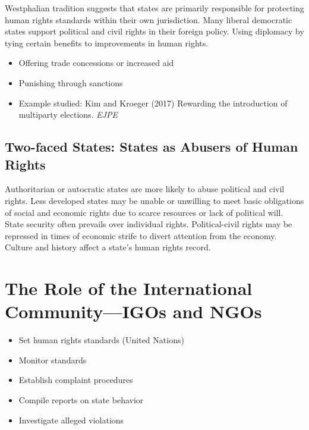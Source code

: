 \documentclass[
]{book}
\begin{document}
Westphalian tradition suggests that states are primarily responsible for protecting human rights standards within their own jurisdiction. Many liberal democratic states support political and civil rights in their foreign policy. Using diplomacy by tying certain benefits to improvements in human rights.

\begin{itemize}
\item
  Offering trade concessions or increased aid
\item
  Punishing through sanctions
\item
  Example studied: Kim and Kroeger (2017) Rewarding the introduction of multiparty elections. \emph{EJPE}
\end{itemize}

\hypertarget{two-faced-states-states-as-abusers-of-human-rights}{%
\subsection{Two-faced States: States as Abusers of Human Rights}\label{two-faced-states-states-as-abusers-of-human-rights}}

Authoritarian or autocratic states are more likely to abuse political and civil rights. Less developed states may be unable or unwilling to meet basic obligations of social and economic rights due to scarce resources or lack of political will. State security often prevails over individual rights. Political-civil rights may be repressed in times of economic strife to divert attention from the economy. Culture and history affect a state's human rights record.

\hypertarget{the-role-of-the-international-communityigos-and-ngos}{%
\section{The Role of the International Community---IGOs and NGOs}\label{the-role-of-the-international-communityigos-and-ngos}}

\begin{itemize}
\item
  Set human rights standards (United Nations)
\item
  Monitor standards
\item
  Establish complaint procedures
\item
  Compile reports on state behavior
\item
  Investigate alleged violations
\end{itemize}
\end{document}
